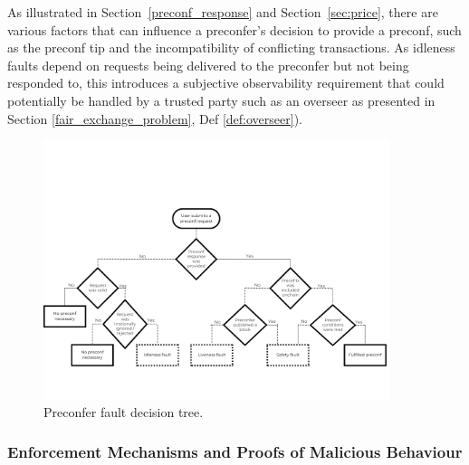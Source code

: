 \documentclass[a4paper]{article}
\theoremstyle{boldstyle}
\newcommand{\cm}[1]{\textcolor{blue}{\textbf{Conor:} #1}}
\newcommand{\dk}[1]{\textcolor{cyan}{\textbf{Demetris:} #1}}
\begin{document}
        As illustrated in Section~\ref{preconf_response} and Section~\ref{sec:price}, there are various factors that can influence a preconfer's decision to provide a preconf, such as the preconf tip and the incompatibility of conflicting transactions. As idleness faults depend on requests being delivered to the preconfer but not being responded to, this introduces a subjective observability requirement that could potentially be handled by a trusted party such as an overseer as presented in Section \ref{fair_exchange_problem}, Def \ref{def:overseer}).
        

    \begin{figure}[htbp]
        \centering
        \includegraphics[width=0.9\textwidth]{figures/preconferFaultDecisionTree.png}
        \caption{Preconfer fault decision tree.}
        \label{preconfer fault tree}
    \end{figure}
    

\subsubsection{Enforcement Mechanisms and Proofs of Malicious Behaviour}
\label{sec:enforcement}
\end{document}
